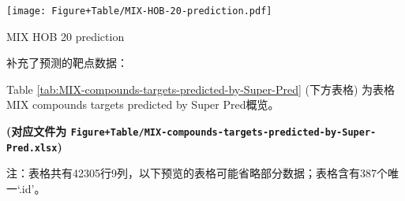\documentclass[
]{article}
\begin{document}
\def\@captype{figure}
\begin{center}
\texttt{[image: Figure+Table/MIX-HOB-20-prediction.pdf]}
\caption{MIX HOB 20 prediction}\label{fig:MIX-HOB-20-prediction}
\end{center}

补充了预测的靶点数据：

Table \ref{tab:MIX-compounds-targets-predicted-by-Super-Pred} (下方表格) 为表格MIX compounds targets predicted by Super Pred概览。

\textbf{(对应文件为 \texttt{Figure+Table/MIX-compounds-targets-predicted-by-Super-Pred.xlsx})}

\begin{center}\begin{tcolorbox}[colback=gray!10, colframe=gray!50, width=0.9\linewidth, arc=1mm, boxrule=0.5pt]注：表格共有42305行9列，以下预览的表格可能省略部分数据；表格含有387个唯一`.id'。
\end{tcolorbox}
\end{center}
\end{document}
